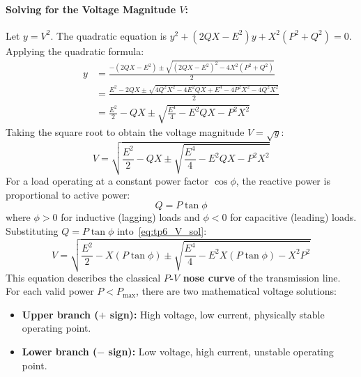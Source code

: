 \paragraph{Solving for the Voltage Magnitude $V$:}
Let $y = V^2$. The quadratic equation is $y^2 + (2QX - E^2)y + X^2(P^2 + Q^2) = 0$.
Applying the quadratic formula:
\begin{align}
    y &= \frac{-(2QX - E^2) \pm \sqrt{(2QX - E^2)^2 - 4 X^2 (P^2 + Q^2)}}{2} \nonumber\\
      &= \frac{E^2 - 2QX \pm \sqrt{4Q^2 X^2 - 4 E^2 Q X + E^4 - 4 P^2 X^2 - 4 Q^2 X^2}}{2} \nonumber\\
      &= \frac{E^2}{2} - QX \pm \sqrt{\frac{E^4}{4} - E^2 Q X - P^2 X^2}
\end{align}
Taking the square root to obtain the voltage magnitude $V = \sqrt{y}$:
\begin{equation}
    \boxed{V = \sqrt{\frac{E^2}{2} - QX \pm \sqrt{\frac{E^4}{4} - E^2 Q X - P^2 X^2}}} \label{eq:tp6_V_sol}
\end{equation}
For a load operating at a constant power factor $\cos\phi$, the reactive power is proportional to active power:
\begin{equation}
    Q = P \tan\phi
\end{equation}
where $\phi > 0$ for inductive (lagging) loads and $\phi < 0$ for capacitive (leading) loads.
Substituting $Q = P\tan\phi$ into~\eqref{eq:tp6_V_sol}:
\begin{equation}
    \boxed{V = \sqrt{\frac{E^2}{2} - X(P\tan\phi) \pm \sqrt{\frac{E^4}{4} - E^2 X (P\tan\phi) - X^2 P^2}}}
\end{equation}
This equation describes the classical \textbf{$P$-$V$ nose curve} of the transmission line.
For each valid power $P < P_{\text{max}}$, there are two mathematical voltage solutions:
\begin{itemize}
    \item \textbf{Upper branch ($+$ sign):} High voltage, low current, physically stable operating point.
    \item \textbf{Lower branch ($-$ sign):} Low voltage, high current, unstable operating point.
\end{itemize}

